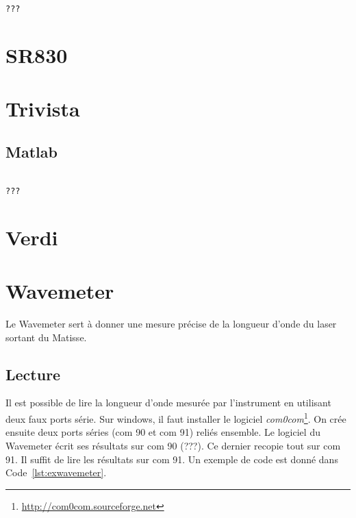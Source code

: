 \documentclass[11pt,francais]{book} %
\begin{document}
\begin{lstlisting}[frame=single,caption={Exemple d'utilisation du SR400 avec Matlab},label={lst:exsr400},breaklines=true,]  % Start your code-block

???
\end{lstlisting}


\section{SR830}


\section{Trivista}

\subsection{Matlab}

\begin{lstlisting}[frame=single,caption={Exemple d'utilisation du Trivista avec Matlab},label={lst:extrivista},breaklines=true,]  % Start your code-block

???
\end{lstlisting}


\section{Verdi}


\section{Wavemeter}

Le Wavemeter sert à donner une mesure précise de la longueur d'onde du laser sortant du Matisse.

\subsection{Lecture}
Il est possible de lire la longueur d'onde mesurée par l'instrument en utilisant deux faux ports série.
Sur windows, il faut installer le logiciel {\it com0com}\footnote{\url{http://com0com.sourceforge.net}}.
On crée ensuite deux ports séries (com 90 et com 91) reliés ensemble.
Le logiciel du Wavemeter écrit ses résultats sur com 90 (???).
Ce dernier recopie tout sur com 91.
Il suffit de lire les résultats sur com 91.
Un exemple de code est donné dans Code~\ref{lst:exwavemeter}.
\end{document}
